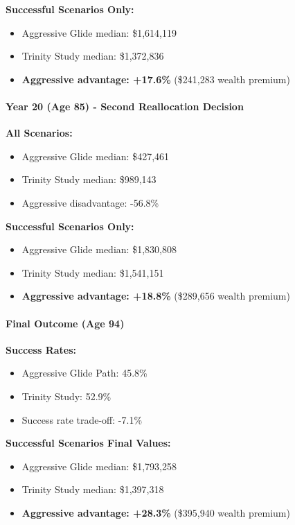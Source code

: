 \documentclass[11pt,letterpaper]{article}
\begin{document}
\textbf{Successful Scenarios Only:}

\begin{itemize}
\item Aggressive Glide median: \$1,614,119
\item Trinity Study median: \$1,372,836
\item \textbf{Aggressive advantage: +17.6\%} (\$241,283 wealth premium)
\end{itemize}

\paragraph{Year 20 (Age 85) - Second Reallocation Decision}
\textbf{All Scenarios:}

\begin{itemize}
\item Aggressive Glide median: \$427,461
\item Trinity Study median: \$989,143
\item Aggressive disadvantage: -56.8\%
\end{itemize}

\textbf{Successful Scenarios Only:}

\begin{itemize}
\item Aggressive Glide median: \$1,830,808
\item Trinity Study median: \$1,541,151
\item \textbf{Aggressive advantage: +18.8\%} (\$289,656 wealth premium)
\end{itemize}

\paragraph{Final Outcome (Age 94)}
\textbf{Success Rates:}

\begin{itemize}
\item Aggressive Glide Path: 45.8\%
\item Trinity Study: 52.9\%
\item Success rate trade-off: -7.1\%
\end{itemize}

\textbf{Successful Scenarios Final Values:}

\begin{itemize}
\item Aggressive Glide median: \$1,793,258
\item Trinity Study median: \$1,397,318
\item \textbf{Aggressive advantage: +28.3\%} (\$395,940 wealth premium)
\end{itemize}
\end{document}
